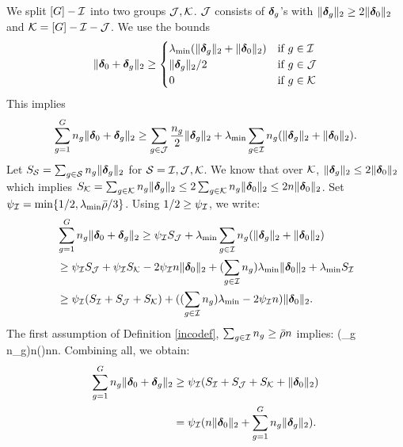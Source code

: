 \begin{IEEEproof}
	We split $[G]-\cI$ into two groups $\cJ,\cK$. $\cJ$ consists of $\boldsymbol{\delta}_g$'s with $\|\boldsymbol{\delta}_g\|_{2}\geq 2\|\boldsymbol{\delta}_0\|_{2}$ and $\cK=[G]-\cI-\cJ$. We use the bounds
	\[
	\norm{\ddelta_0+\ddelta_g}{2}\geq 
	\begin{cases}
	\lamin(\norm{\ddelta_g}{2}+\norm{\ddelta_0}{2}) &\text{if}~g\in \cI
	\\ 
	\norm{\ddelta_g}{2}/2 &\text{if}~g\in \cJ
	\\
	0 &\text{if}~g\in \cK			
	\end{cases}
	\] 
	This implies
	\[
	\sum_{g=1}^G n_g\norm{\ddelta_0+\ddelta_g}{2}\geq \sum_{g\in \cJ}\frac{n_g}{2}\norm{\ddelta_g}{2}+\lamin\sum_{g\in \cI} n_g (\norm{\ddelta_g}{2}+\norm{\ddelta_0}{2}).
	\]
	Let $S_\cS=\sum_{g\in \cS}n_g\norm{\ddelta_g}{2}$ for $\cS=\cI,\cJ,\cK$.
	We know that over $\cK$, $\|\boldsymbol{\delta}_g\|_{2}\leq 2\|\boldsymbol{\delta}_0\|_{2}$ which implies $S_\cK = \sum_{g\in \cK}n_g\norm{\ddelta_g}{2}\leq 2\sum_{g\in \cK}n_g\norm{\ddelta_0}{2}\leq 2n\norm{\ddelta_0}{2}$. Set $\rinc=\min\{1/2,\lamin\ratio/3\}$. %
	Using $1/2\geq \rinc$, we write:
	\begin{align}
	\nr 
	&\sum_{g=1}^G n_g\norm{\ddelta_0+\ddelta_g}{2}
	\geq \rinc S_\cJ +\lamin\sum_{g\in \cI}n_g (\norm{\ddelta_g}{2}+\norm{\ddelta_0}{2})
	\\ \nr 
	&\geq \rinc S_\cJ +\rinc S_\cK - 2\rinc n\norm{\ddelta_0}{2}+(\sum_{g\in \cI} n_g)\lamin \norm{\ddelta_0}{2}+\lamin S_{\Ic}
	\\ \nr 
	&\geq \rinc (S_\cI + S_\cJ + S_\cK)+ ((\sum_{g\in \cI} n_g)\lamin-2\rinc n)\norm{\ddelta_0}{2}.
	\end{align} 
	The first assumption of Definition \eqref{incodef}, $\sum_{g\in \cI} n_g \geq \ratio n$ implies:
	\be 
	\nr 
	(\sum_{g\in \cI} n_g)\rinc n\geq (\ratio{}\rinc)n\geq \rinc n.
	\ee 
	Combining all, we obtain:
	\begin{align}
	\nr 
	\sum_{g=1}^Gn_g \norm{\ddelta_0+\ddelta_g}{2} &\geq \rinc (S_\cI + S_\cJ + S_\cK + \norm{\ddelta_0}{2}) 
	\\ \nr 
	&= \rinc(n\norm{\ddelta_0}{2} +\sum_{g=1}^G n_g\norm{\ddelta_g}{2}).
	\end{align}
\end{IEEEproof}
	

